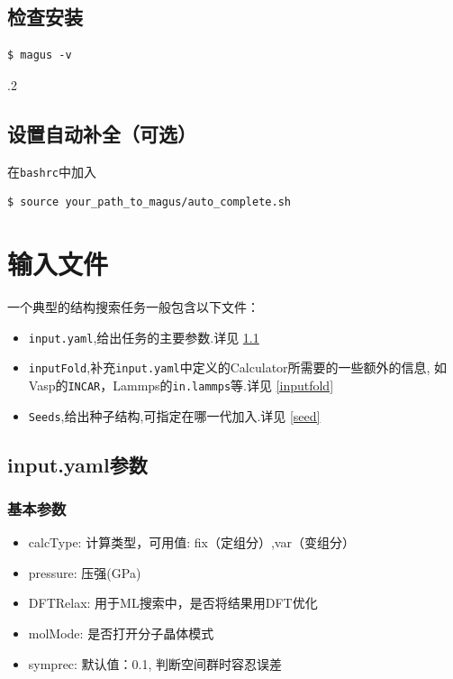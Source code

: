 \documentclass[12pt]{article}
\newcommand{\file}[1]{\texttt{#1}}
\begin{document}
\subsection{检查安装}
\begin{tcolorbox}
    \begin{verbatim}
$ magus -v
    \end{verbatim}
.2
\end{tcolorbox}

\subsection{设置自动补全（可选）}
在\file{bashrc}中加入
\begin{tcolorbox}
    \begin{verbatim}
$ source your_path_to_magus/auto_complete.sh
    \end{verbatim}
\end{tcolorbox}
\newpage
\section{输入文件}
一个典型的结构搜索任务一般包含以下文件：
\begin{itemize}
    \item \file{input.yaml},给出任务的主要参数.详见 \ref{inputpara}
    \item \file{inputFold},补充\file{input.yaml}中定义的Calculator所需要的一些额外的信息,
    如Vasp的\file{INCAR}，Lammps的\file{in.lammps}等.详见 \ref{inputfold}
    \item \file{Seeds},给出种子结构,可指定在哪一代加入.详见 \ref{seed}
\end{itemize}
\subsection{input.yaml参数} \label{inputpara}

\subsubsection{基本参数}
\begin{itemize}
    \item calcType: 计算类型，可用值:  fix（定组分）,var（变组分）
    \item pressure: 压强(GPa)
    \item DFTRelax: 用于ML搜索中，是否将结果用DFT优化
    \item molMode: 是否打开分子晶体模式
    \item symprec: 默认值：0.1, 判断空间群时容忍误差
\end{itemize}
\end{document}
